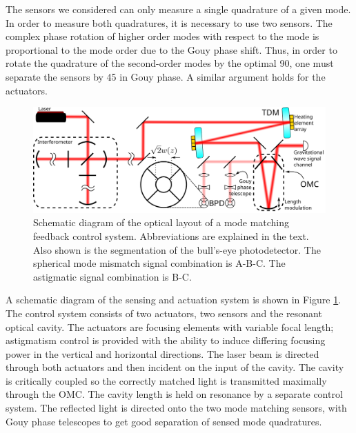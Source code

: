 The sensors we considered can only measure a single quadrature of a given mode. %
In order to measure both quadratures, it is necessary to use two sensors. %
The complex phase rotation of higher order modes with respect to the  mode is proportional to the mode order due to the Gouy phase shift. %
Thus, in order to rotate the quadrature of the second-order modes by the optimal 90\degrees{}, one must separate the sensors by 45\degrees{} in Gouy phase. %
A similar argument holds for the actuators.

\begin{figure}
  \begin{center}
  \leavevmode
  \includegraphics[width=\textwidth]{figs-modematching/blockdiag}
  \end{center}
  \caption[Schematic diagram of the optical layout of a mode matching feedback control system.]{Schematic diagram of the optical layout of a mode matching feedback control system. Abbreviations are explained in the text. Also shown is the segmentation of the bull's-eye photodetector. The spherical mode mismatch signal combination is A-B-C. The astigmatic signal combination is B-C.}
  \label{fig:mmblockdiag}
\end{figure}
A schematic diagram of the sensing and actuation system is shown in Figure \ref{fig:mmblockdiag}. %
The control system consists of two actuators, two sensors and the resonant optical cavity. %
The actuators are focusing elements with variable focal length; astigmatism control is provided with the ability to induce differing focusing power in the vertical and horizontal directions. %
The laser beam is directed through both actuators and then incident on the input of the cavity. %
The cavity is critically coupled so the correctly matched light is transmitted maximally through the OMC. %
The cavity length is held on resonance by a separate control system. %
The reflected light is directed onto the two mode matching sensors, with Gouy phase telescopes to get good separation of sensed mode quadratures.


